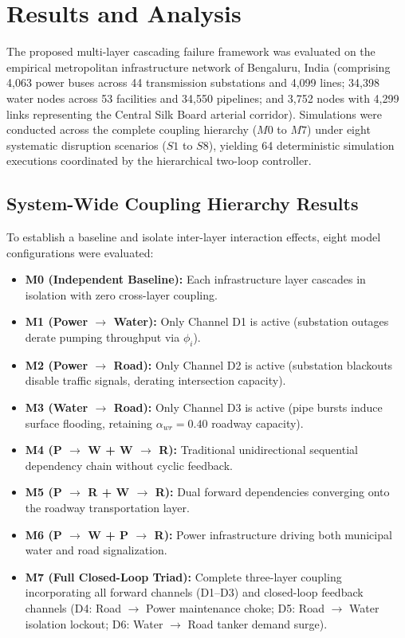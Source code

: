 \section{Results and Analysis}
\label{sec:results}

The proposed multi-layer cascading failure framework was evaluated on the empirical metropolitan infrastructure network of Bengaluru, India (comprising 4,063 power buses across 44 transmission substations and 4,099 lines; 34,398 water nodes across 53 facilities and 34,550 pipelines; and 3,752 nodes with 4,299 links representing the Central Silk Board arterial corridor). Simulations were conducted across the complete coupling hierarchy ($M0$ to $M7$) under eight systematic disruption scenarios ($S1$ to $S8$), yielding 64 deterministic simulation executions coordinated by the hierarchical two-loop controller.

\subsection{System-Wide Coupling Hierarchy Results}

To establish a baseline and isolate inter-layer interaction effects, eight model configurations were evaluated:
\begin{itemize}
    \item \textbf{M0 (Independent Baseline):} Each infrastructure layer cascades in isolation with zero cross-layer coupling.
    \item \textbf{M1 (Power $\rightarrow$ Water):} Only Channel D1 is active (substation outages derate pumping throughput via $\phi_i$).
    \item \textbf{M2 (Power $\rightarrow$ Road):} Only Channel D2 is active (substation blackouts disable traffic signals, derating intersection capacity).
    \item \textbf{M3 (Water $\rightarrow$ Road):} Only Channel D3 is active (pipe bursts induce surface flooding, retaining $\alpha_{wr}=0.40$ roadway capacity).
    \item \textbf{M4 (P $\rightarrow$ W + W $\rightarrow$ R):} Traditional unidirectional sequential dependency chain without cyclic feedback.
    \item \textbf{M5 (P $\rightarrow$ R + W $\rightarrow$ R):} Dual forward dependencies converging onto the roadway transportation layer.
    \item \textbf{M6 (P $\rightarrow$ W + P $\rightarrow$ R):} Power infrastructure driving both municipal water and road signalization.
    \item \textbf{M7 (Full Closed-Loop Triad):} Complete three-layer coupling incorporating all forward channels (D1--D3) and closed-loop feedback channels (D4: Road $\rightarrow$ Power maintenance choke; D5: Road $\rightarrow$ Water isolation lockout; D6: Water $\rightarrow$ Road tanker demand surge).
\end{itemize}

